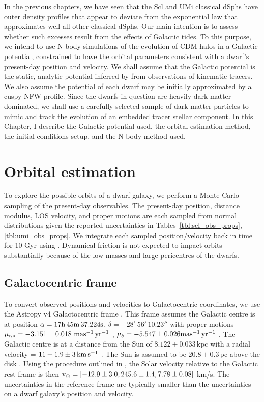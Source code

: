 In the previous chapters, we have seen that the Scl and UMi classical
dSphs have outer density profiles that appear to deviate from the
exponential law that approximates well all other classical dSphs. Our
main intention is to assess whether such excesses result from the
effects of Galactic tides. To this purpose, we intend to use N-body
simulations of the evolution of CDM halos in a Galactic potential,
constrained to have the orbital parameters consistent with a dwarf's
present-day position and velocity. We shall assume that the Galactic
potential is the static, analytic potential inferred by
\citet{mcmillan2011} from observations of kinematic tracers. We also
assume the potential of each dwarf may be initially approximated by a
cuspy NFW profile. Since the dwarfs in question are heavily dark matter
dominated, we shall use a carefully selected sample of dark matter
particles to mimic and track the evolution of an embedded tracer stellar
component. In this Chapter, I describe the Galactic potential used, the
orbital estimation method, the initial conditions setup, and the N-body
method used.

\section{Orbital estimation}\label{orbital-estimation}

To explore the possible orbits of a dwarf galaxy, we perform a Monte
Carlo sampling of the present-day observables. The present-day position,
distance modulus, LOS velocity, and proper motions are each sampled from
normal distributions given the reported uncertainties in
Tables~\ref{tbl:scl_obs_props}, \ref{tbl:umi_obs_props}. We integrate
each sampled position/velocity back in time for 10 Gyr using \agama{}
\citep{agama}. Dynamical friction is not expected to impact orbits
substantially because of the low masses and large pericentres of the
dwarfs.

\subsection{Galactocentric frame}\label{galactocentric-frame}

To convert observed positions and velocities to Galactocentric
coordinates, we use the Astropy v4 Galactocentric frame
\citep{astropycollaboration+2022}. This frame assumes the Galactic
centre is at position \(\alpha = {\rm 17h\,45m\,37.224s}\),
\(\delta = -28^\circ\,56'\,10.23''\) with proper motions
\(\mu_{\alpha*}=-3.151\pm0.018\ {\rm mas^{-1}\,yr^{-1}}\) ,
\(\mu_\delta=-5.547\pm0.026 {\rm mas^{-1}\,yr^{-1}}\) \citep[from the appendix and Table
2 of][]{reid+brunthaler2004}. The Galactic centre is at a distance from
the Sun of \(8.122\pm0.033\,\)kpc with a radial velocity =
\(11 + 1.9 \pm 3\,{\rm km\,s^{-1}}\) \citep{gravitycollaboration+2018}. The Sun is
assumed to be \(20.8\pm0.3\,\)pc above the disk
\citep{bennett+bovy2019}. Using the procedure outlined in
\citet{drimmel+poggio2018}, the Solar velocity relative to the Galactic
rest frame is then
\({\rm v}_\odot = [-12.9 \pm 3.0, 245.6 \pm 1.4, 7.78 \pm 0.08]\) km/s. The
uncertainties in the reference frame are typically smaller than the
uncertainties on a dwarf galaxy's position and velocity.

